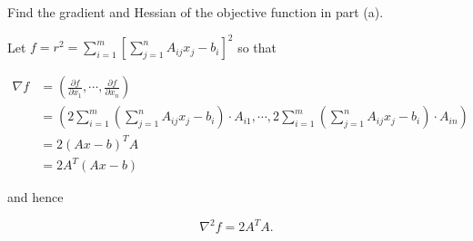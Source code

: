 Find the gradient and Hessian of the objective function in part (a).

\begin{solution}
  Let $f = r^2 = \sum\limits_{i=1}^m\left[ \sum\limits_{j=1}^n A_{ij} x_j - b_i \right]^2$ so that
  
  \begin{align*}
  \nabla f &= \left(\frac{\partial f}{\partial x_1}, \cdots,  \frac{\partial f}{\partial x_n} \right) \\
           &= \left(2 \sum\limits_{i=1}^m \left( \sum\limits_{j=1}^n A_{ij} x_j - b_i \right) \cdot A_{i1}, \cdots, 2 \sum\limits_{i=1}^m \left( \sum\limits_{j=1}^n A_{ij} x_j - b_i \right) \cdot A_{in} \right) \\
           &= 2 (Ax - b)^T A \\
           &= 2 A^T (Ax - b)
  \end{align*}

  and hence

  $$
  \nabla^2 f = 2 A^T A.
  $$
  \ \\
\end{solution}